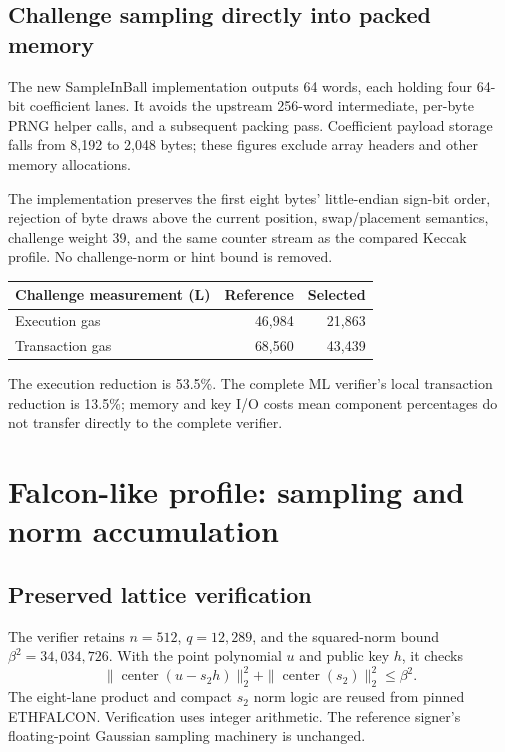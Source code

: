 \documentclass[11pt,a4paper]{article}
\newcommand{\local}{\textbf{L}}
\begin{document}
\subsection{Challenge sampling directly into packed memory}
The new SampleInBall implementation outputs 64 words, each holding four
64-bit coefficient lanes. It avoids the upstream 256-word intermediate,
per-byte PRNG helper calls, and a subsequent packing pass. Coefficient payload
storage falls from 8,192 to 2,048 bytes; these figures exclude array headers
and other memory allocations.

The implementation preserves the first eight bytes' little-endian sign-bit
order, rejection of byte draws above the current position, swap/placement
semantics, challenge weight 39, and the same counter stream as the compared
Keccak profile. No challenge-norm or hint bound is removed.

\begin{tabularx}{\linewidth}{Yrr}
\toprule
\textbf{Challenge measurement (\local)} & \textbf{Reference} & \textbf{Selected}\\
\midrule
Execution gas & 46,984 & 21,863\\
Transaction gas & 68,560 & 43,439\\
\bottomrule
\end{tabularx}
The execution reduction is 53.5\%. The complete ML verifier's
local transaction reduction is 13.5\%; memory and key I/O costs mean
component percentages do not transfer directly to the complete verifier.

\newpage
\section{Falcon-like profile: sampling and norm accumulation}
\subsection{Preserved lattice verification}
The verifier retains $n=512$, $q=12{,}289$, and the squared-norm bound
$\beta^2=34{,}034{,}726$. With the point polynomial $u$ and public key $h$,
it checks
\begin{equation}
 \|\operatorname{center}(u-s_2h)\|_2^2+
 \|\operatorname{center}(s_2)\|_2^2\leq\beta^2.
\end{equation}
The eight-lane product and compact $s_2$ norm logic are reused from pinned
ETHFALCON. Verification uses integer arithmetic. The reference signer's
floating-point Gaussian sampling machinery is unchanged.
\end{document}

